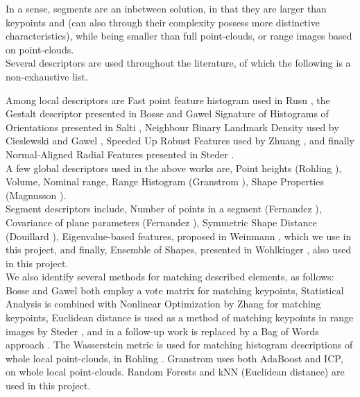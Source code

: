 In a sense, segments are an inbetween solution, in that they are larger than keypoints and (can also through their complexity possess more distinctive characteristics), while being smaller than full point-clouds, or range images based on point-clouds.\\


Several descriptors are used throughout the literature, of which the following is a non-exhaustive list.

Among local descriptors are 
Fast point feature histogram used in Rusu \cite{rusu2009fast}, 
the Gestalt descriptor presented in Bosse \cite{bosse2013place} and Gawel \cite{Gawel2016}
Signature of Histograms of Orientations presented in Salti \cite{salti2014shot},
Neighbour Binary Landmark Density used by Cieslewski \cite{cieslewski2016point} and Gawel \cite{Gawel2016},
Speeded Up Robust Features used by Zhuang \cite{zhuang20133}, and finally 
Normal-Aligned Radial Features presented in Steder \cite{steder2011place}.\\

A few global descriptors used in the above works are,
Point heights (Rohling \cite{rohling2015fast}),
Volume, Nominal range, Range Histogram (Granstrom \cite{granstrom2011learning}),
Shape Properties (Magnusson \cite{magnusson2009automatic}).\\

Segment descriptors include,
Number of points in a segment (Fernandez \cite{fernandez2013fast}),
Covariance of plane parameters (Fernandez \cite{fernandez2016scene}),
Symmetric Shape Distance (Douillard \cite{douillard2012scan}),
Eigenvalue-based features, proposed in Weinmann \cite{weinmann2014semantic}, which we use in this project,
and finally,
Ensemble of Shapes, presented in Wohlkinger \cite{wohlkinger2011ensemble}, also used in this project.\\


We also identify several methods for matching described elements, as follows:\\


Bosse \cite{bosse2013place} and Gawel \cite{Gawel2016} both employ a vote matrix for matching keypoints,
Statistical Analysis is combined with Nonlinear Optimization by Zhang \cite{zhang2014loam} for matching keypoints,
Euclidean distance is used as a method of matching keypoints in range images by Steder \cite{steder2010robust},
and in a follow-up work is replaced by a Bag of Words approach \cite{steder2011place}.
The Wasserstein metric is used for matching histogram descriptions of whole local point-clouds, in Rohling \cite{rohling2015fast}.
Granstrom \cite{granstrom2011learning} uses both AdaBoost and ICP, on whole local point-clouds.
Random Forests and kNN (Euclidean distance) are used in this project.\\

